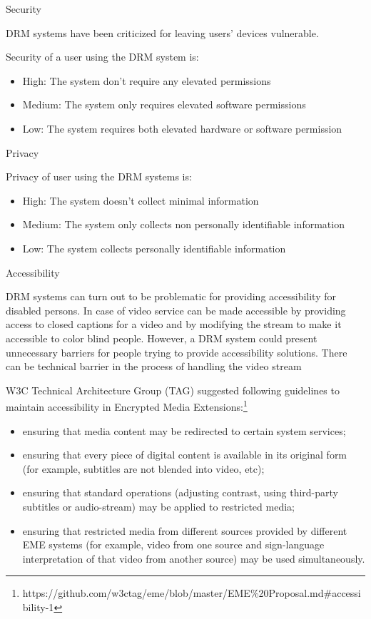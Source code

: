 \protect\hypertarget{anchor-6}{}{}Security

DRM systems have been criticized for leaving users' devices vulnerable.

Security of a user using the DRM system is:

\begin{itemize}
\tightlist
\item
  High: The system don't require any elevated permissions
\item
  Medium: The system only requires elevated software permissions 
\item
  Low: The system requires both elevated hardware or software permission
\end{itemize}

\protect\hypertarget{anchor-7}{}{}Privacy

Privacy of user using the DRM systems is:

\begin{itemize}
\tightlist
\item
  High: The system doesn't collect minimal information
\item
  Medium: The system only collects non personally identifiable
  information
\item
  Low: The system collects personally identifiable information
\end{itemize}

\protect\hypertarget{anchor-8}{}{}Accessibility

DRM systems can turn out to be problematic for providing accessibility
for disabled persons. In case of video service can be made accessible by
providing access to closed captions for a video and by modifying the
stream to make it accessible to color blind people. However, a DRM
system could present unnecessary barriers for people trying to provide
accessibility solutions. There can be technical barrier in the process
of handling the video stream

W3C Technical Architecture Group (TAG) suggested following guidelines to
maintain accessibility in Encrypted Media Extensions:\footnote{https://github.com/w3ctag/eme/blob/master/EME\%20Proposal.md\#accessibility-1}

\begin{itemize}
\tightlist
\item
  ensuring that media content may be redirected to certain system
  services;
\item
  ensuring that every piece of digital content is available in its
  original form (for example, subtitles are not blended into video,
  etc);
\item
  ensuring that standard operations (adjusting contrast, using
  third-party subtitles or audio-stream) may be applied to restricted
  media;
\item
  ensuring that restricted media from different sources provided by
  different EME systems (for example, video from one source and
  sign-language interpretation of that video from another source) may be
  used simultaneously.
\end{itemize}

